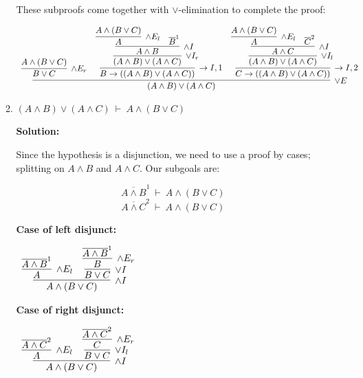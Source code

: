 \documentclass[11pt]{report}
\newcommand{\temp}[2]{{\overline{#2}}^{#1}}
\begin{document}
\begin{enumerate}
\begin{enumerate}
		These subproofs come together with $\lor$-elimination to complete the proof: 

	\begin{scriptsize}
		\begin{center}
			$\begin{array}{c}
				\infer[\lor E]{(A \land B) \lor (A \land C)}
					{\infer[\land E_{r}]{B \lor C}{A \land (B \lor C)}
						&
					\infer[\to I, 1]{B \to ((A \land B) \lor (A \land C))}
						{\infer[\lor I_{r}]{(A \land B) \lor (A \land C)}{\infer[\land I]{A \land B}
								{\infer[\land E_{l}]{A}
									{A \land (B \lor C)}
							&
						\temp{1}{B}}}}
					&
					\infer[\to I,2]{C \to ((A \land B) \lor (A \land C))}{\infer[\lor I_{l}]{(A \land B) \lor (A \land C)}{\infer[\land I]{A \land C}
						{\infer[\land E_{l}]{A}{A \land (B \lor C)}
							&
						\temp{2}{C}}}}
						}
			\end{array}$
		\end{center}
	\end{scriptsize}
		
		\newpage
		\item $(A \land B) \lor (A \land C) \ \vdash \ A \land (B \lor C)$
		
		\textbf{Solution:}

		Since the hypothesis is a disjunction, we need to use a proof by cases; splitting on $A \land B$ and $A \land C$. Our subgoals are: 

		$$\temp{1}{A \land B} \ \vdash \ A \land (B \lor C) $$
		$$\temp{2}{A \land C} \ \vdash \ A \land (B \lor C) $$

		\textbf{Case of left disjunct:}

		\begin{center}
			$\begin{array}{c}
				\infer[\land I]{A \land (B \lor C)}
					{\infer[\land E_{l}]{A}{\temp{1}{A \land B}}
					&
					\infer[\lor I]{B \lor C}
						{\infer[\land E_{r}]{B}
							{\temp{1}{A \land B}}}}
			\end{array}$
		\end{center}


		\textbf{Case of right disjunct:}
		\begin{center}
			$\begin{array}{c}
				\infer[\land I]{A \land (B \lor C)}
					{\infer[\land E_{l}]{A}{\temp{2}{A \land C}}
					&
					\infer[\lor I_{l}]{B \lor C}
						{\infer[\land E_{r}]{C}
							{\temp{2}{A \land C}}}}
			\end{array}$
		\end{center}


\end{enumerate}
\end{enumerate}
\end{document}
